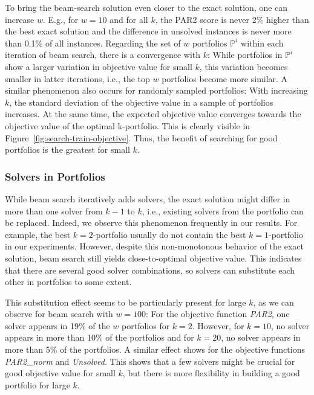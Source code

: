 \documentclass[conference]{IEEEtran}
\begin{document}
To bring the beam-search solution even closer to the exact solution, one can increase $w$.
E.g., for $w=10$ and for all $k$, the PAR2 score is never 2\% higher than the best exact solution and the difference in unsolved instances is never more than 0.1\% of all instances.
Regarding the set of $w$ portfolios $\mathbb{P}^i$ within each iteration of beam search, there is a convergence with $k$:
While portfolios in $\mathbb{P}^i$ show a larger variation in objective value for small $k$, this variation becomes smaller in latter iterations, i.e., the top $w$ portfolios become more similar.
A similar phenomenon also occurs for randomly sampled portfolios:
With increasing $k$, the standard deviation of the objective value in a sample of portfolios increases.
At the same time, the expected objective value converges towards the objective value of the optimal k-portfolio.
This is clearly visible in Figure~\ref{fig:search-train-objective}.
Thus, the benefit of searching for good portfolios is the greatest for small $k$.

\subsubsection{Solvers in Portfolios}

While beam search iteratively adds solvers, the exact solution might differ in more than one solver from $k-1$ to $k$, i.e., existing solvers from the portfolio can be replaced.
Indeed, we observe this phenomenon frequently in our results.
For example, the best $k=2$-portfolio usually do not contain the best $k=1$-portfolio in our experiments.
However, despite this non-monotonous behavior of the exact solution, beam search still yields close-to-optimal objective value.
This indicates that there are several good solver combinations, so solvers can substitute each other in portfolios to some extent.

This substitution effect seems to be particularly present for large $k$, as we can observe for beam search with $w=100$:
For the objective function \emph{PAR2}, one solver appears in 19\% of the $w$ portfolios for $k=2$.
However, for $k=10$, no solver appears in more than 10\% of the portfolios and for $k=20$, no solver appears in more than 5\% of the portfolios.
A similar effect shows for the objective functions \emph{PAR2\_norm} and \emph{Unsolved}.
This shows that a few solvers might be crucial for good objective value for small $k$, but there is more flexibility in building a good portfolio for large $k$.
\end{document}
